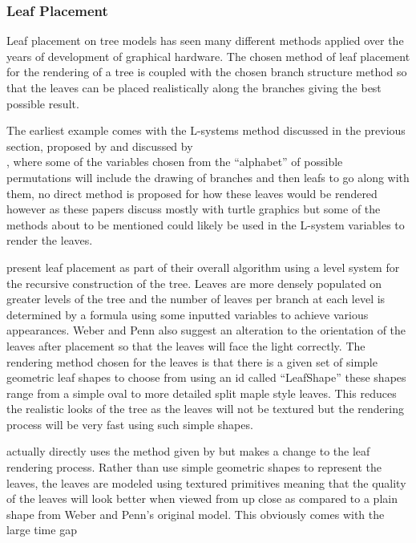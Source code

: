\documentclass[review]{cmpreport}
\begin{document}
\subsubsection{Leaf Placement}
Leaf placement on tree models has seen many different methods applied over the years 
of development of graphical hardware. The chosen method of leaf placement for the 
rendering of a tree is coupled with the chosen branch structure method so that the 
leaves can be placed realistically along the branches giving the best possible result. \par
The earliest example comes with the L-systems method discussed in the previous section, 
proposed by \cite{lindenmayer1968mathematical} and discussed by \\ \cite{prusinkiewicz1996systems}, 
where some of the variables chosen from the ``alphabet'' of possible permutations will 
include the drawing of branches and then leafs to go along with them, no direct method is 
proposed for how these leaves would be rendered however as these papers discuss mostly with 
turtle graphics but some of the methods about to be mentioned could likely be used in 
the L-system variables to render the leaves. \par
\cite{weber1995rendering} present leaf placement as part of their overall algorithm using 
a level system for the recursive construction of the tree. Leaves are more densely populated 
on greater levels of the tree and the number of leaves per branch at each level is determined 
by a formula using some inputted variables to achieve various appearances. Weber and Penn 
also suggest an alteration to the orientation of the leaves after placement so that the leaves 
will face the light correctly. The rendering method chosen for the leaves is that there is a 
given set of simple geometric leaf shapes to choose from using an id called ``LeafShape'' 
these shapes range from a simple oval to more detailed split maple style leaves. This reduces 
the realistic looks of the tree as the leaves will not be textured but the rendering process 
will be very fast using such simple shapes. \par
\cite{wesslen2005real} actually directly uses the method given by \cite{weber1995rendering} 
but makes a change to the leaf rendering process. Rather than use simple geometric shapes 
to represent the leaves, the leaves are modeled using textured primitives meaning that the 
quality of the leaves will look better when viewed from up close as compared to a plain 
shape from Weber and Penn's original model. This obviously comes with the large time gap 
\end{document}
